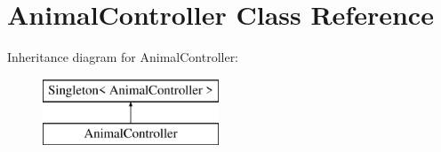\hypertarget{class_animal_controller}{}\section{Animal\+Controller Class Reference}
\label{class_animal_controller}
Inheritance diagram for Animal\+Controller\+:\begin{figure}[H]
\begin{center}
\leavevmode
\includegraphics[height=2.000000cm]{class_animal_controller}
\end{center}
\end{figure}
